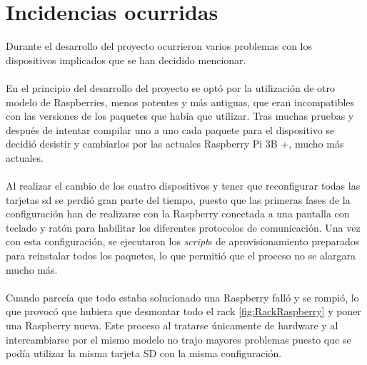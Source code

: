 \section{Incidencias ocurridas}
Durante el desarrollo del proyecto ocurrieron varios problemas con los dispositivos implicados que se han decidido mencionar. 
\\ \\
En el principio del desarrollo del proyecto se optó por la utilización de otro modelo de Raspberries, menos potentes y más antiguas, que eran incompatibles con las versiones de los paquetes que había que utilizar. Tras muchas pruebas y después de intentar compilar uno a uno cada paquete para el dispositivo se decidió desistir y cambiarlos por las actuales Raspberry Pi 3B +, mucho más actuales.
\\ \\
Al realizar el cambio de los cuatro dispositivos y tener que reconfigurar todas las tarjetas sd se perdió gran parte del tiempo, puesto que las primeras fases de la configuración han de realizarse con la Raspberry conectada a una pantalla con teclado y ratón para habilitar los diferentes protocolos de comunicación. Una vez con esta configuración, se ejecutaron los \textit{script}s de aprovisionamiento preparados para reinstalar todos los paquetes, lo que permitió que el proceso no se alargara mucho más. 
\\ \\
Cuando parecía que todo estaba solucionado una Raspberry falló y se rompió, lo que provocó que hubiera que desmontar todo el rack \ref{fig:RackRaspberry} y poner una Raspberry nueva. Este proceso al tratarse únicamente de hardware y al intercambiarse por el mismo modelo no trajo mayores problemas puesto que se podía utilizar la misma tarjeta SD con la misma configuración.
